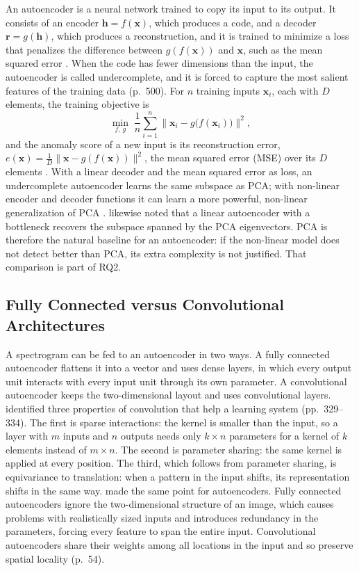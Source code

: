An autoencoder is a neural network trained to copy its input to its output. It consists of an encoder $\mathbf{h} = f(\mathbf{x})$, which produces a code, and a decoder $\mathbf{r} = g(\mathbf{h})$, which produces a reconstruction, and it is trained to minimize a loss that penalizes the difference between $g(f(\mathbf{x}))$ and $\mathbf{x}$, such as the mean squared error \parencite[pp.~499--500]{goodfellow2016}. When the code has fewer dimensions than the input, the autoencoder is called undercomplete, and it is forced to capture the most salient features of the training data (p.~500). For $n$ training inputs $\mathbf{x}_i$, each with $D$ elements, the training objective is
\begin{equation}
  \min_{f,\, g} \; \frac{1}{n} \sum_{i=1}^{n} \bigl\lVert \mathbf{x}_i - g\bigl(f(\mathbf{x}_i)\bigr) \bigr\rVert^2 ,
  \label{eq:ae-objective}
\end{equation}
and the anomaly score of a new input is its reconstruction error, $e(\mathbf{x}) = \frac{1}{D} \lVert \mathbf{x} - g(f(\mathbf{x})) \rVert^2$, the mean squared error (MSE) over its $D$ elements \parencite{ruff2021}. With a linear decoder and the mean squared error as loss, an undercomplete autoencoder learns the same subspace as PCA; with non-linear encoder and decoder functions it can learn a more powerful, non-linear generalization of PCA \parencite[p.~500]{goodfellow2016}. \Textcite{ruff2021} likewise noted that a linear autoencoder with a bottleneck recovers the subspace spanned by the PCA eigenvectors. PCA is therefore the natural baseline for an autoencoder: if the non-linear model does not detect better than PCA, its extra complexity is not justified. That comparison is part of RQ2.

\subsection{Fully Connected versus Convolutional Architectures}
\label{sec:ae-architectures}

A spectrogram can be fed to an autoencoder in two ways. A fully connected autoencoder flattens it into a vector and uses dense layers, in which every output unit interacts with every input unit through its own parameter. A convolutional autoencoder keeps the two-dimensional layout and uses convolutional layers. \Textcite{goodfellow2016} identified three properties of convolution that help a learning system (pp.~329--334). The first is sparse interactions: the kernel is smaller than the input, so a layer with $m$ inputs and $n$ outputs needs only $k \times n$ parameters for a kernel of $k$ elements instead of $m \times n$. The second is parameter sharing: the same kernel is applied at every position. The third, which follows from parameter sharing, is equivariance to translation: when a pattern in the input shifts, its representation shifts in the same way. \Textcite{masci2011} made the same point for autoencoders. Fully connected autoencoders ignore the two-dimensional structure of an image, which causes problems with realistically sized inputs and introduces redundancy in the parameters, forcing every feature to span the entire input. Convolutional autoencoders share their weights among all locations in the input and so preserve spatial locality (p.~54).

